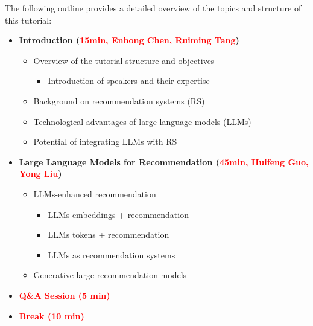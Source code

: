The following outline provides a detailed overview of the topics and structure of this tutorial:

\begin{itemize}[left=0pt]
    \item \textbf{Introduction (\textcolor{red}{15min, Enhong Chen, Ruiming Tang})}
    \begin{itemize}
        \item Overview of the tutorial structure and objectives
        \begin{itemize}
            \item Introduction of speakers and their expertise
        \end{itemize}
        \item Background on recommendation systems (RS)
        \item Technological advantages of large language models (LLMs)
        \item Potential of integrating LLMs with RS
    \end{itemize}
    
    \item \textbf{Large Language Models for Recommendation (\textcolor{red}{45min, Huifeng Guo, Yong Liu})}
    \begin{itemize}
        \item LLMs-enhanced recommendation
        \begin{itemize}
            \item LLMs embeddings + recommendation~\cite{li2023ctrl}
            \item LLMs tokens + recommendation~\cite{liu2024once,xi2024towards}
            \item LLMs as recommendation systems~\cite{zhai2023knowledge}
        \end{itemize}
        \item Generative large recommendation models~\cite{zhang2024scaling,zhai2024actions,liu2024multi,chen2024hllm,ye2025fuxi}
    \end{itemize}
    
    \item \textbf{\textcolor{red}{Q\&A Session (5 min)}}
    
    \item \textbf{\textcolor{red}{Break (10 min)}}
    

\end{itemize}
